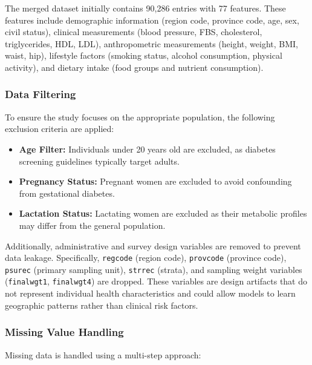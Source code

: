 The merged dataset initially contains 90,286 entries with 77 features. These features include demographic information (region code, province code, age, sex, civil status), clinical measurements (blood pressure, FBS, cholesterol, triglycerides, HDL, LDL), anthropometric measurements (height, weight, BMI, waist, hip), lifestyle factors (smoking status, alcohol consumption, physical activity), and dietary intake (food groups and nutrient consumption).

\subsubsection{Data Filtering}

To ensure the study focuses on the appropriate population, the following exclusion criteria are applied:

\begin{itemize}
    \item \textbf{Age Filter:} Individuals under 20 years old are excluded, as diabetes screening guidelines typically target adults.
    \item \textbf{Pregnancy Status:} Pregnant women are excluded to avoid confounding from gestational diabetes.
    \item \textbf{Lactation Status:} Lactating women are excluded as their metabolic profiles may differ from the general population.
\end{itemize}

Additionally, administrative and survey design variables are removed to prevent data leakage. Specifically, \texttt{regcode} (region code), \texttt{provcode} (province code), \texttt{psurec} (primary sampling unit), \texttt{strrec} (strata), and sampling weight variables (\texttt{finalwgt1}, \texttt{finalwgt4}) are dropped. These variables are design artifacts that do not represent individual health characteristics and could allow models to learn geographic patterns rather than clinical risk factors.

\subsubsection{Missing Value Handling}

Missing data is handled using a multi-step approach:


